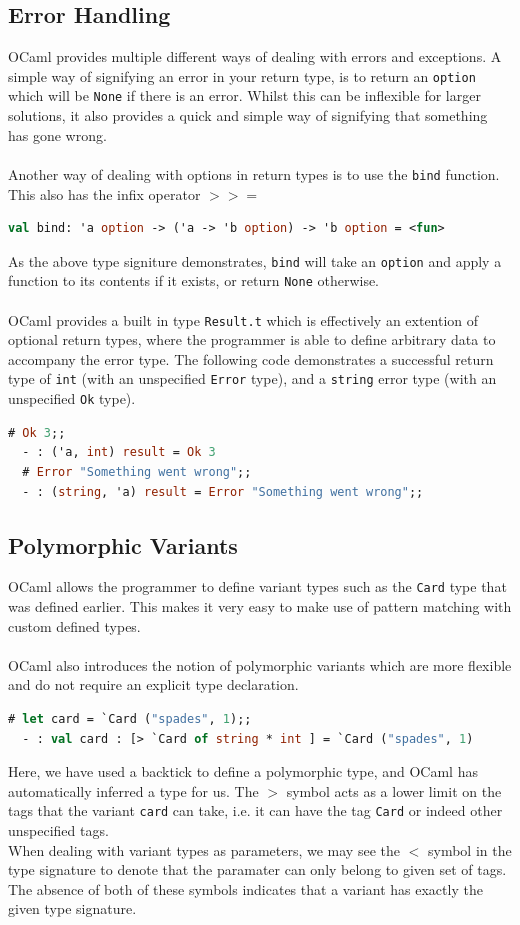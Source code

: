 \documentclass[12pt,a4paper,twoside,openright]{report}
\begin{document}
		\subsection*{Error Handling}
		OCaml provides multiple different ways of dealing with errors and exceptions. 
		A simple way of signifying an error in your return type, is to return an \texttt{option} which will be \texttt{None} if there is an error. 
		Whilst this can be inflexible for larger solutions, it also provides a quick and simple way of signifying that something has gone wrong.\\
		\\
		Another way of dealing with options in return types is to use the \texttt{bind} function. This also has the infix operator $>>=$
		\begin{lstlisting}[language=Caml,showstringspaces=false]
  val bind: 'a option -> ('a -> 'b option) -> 'b option = <fun>
		\end{lstlisting} 
		As the above type signiture demonstrates, \texttt{bind} will take an \texttt{option} and apply a function to its contents if it exists, or return \texttt{None} otherwise.\\
		\\
		OCaml provides a built in type \texttt{Result.t} which is effectively an extention of optional return types, where the programmer is able to define arbitrary data to accompany the error type. The following code demonstrates a successful return type of \texttt{int} (with an unspecified \texttt{Error} type), and a \texttt{string} error type (with an unspecified \texttt{Ok} type).
		\begin{lstlisting}[language=Caml,showstringspaces=false]
  # Ok 3;;
  - : ('a, int) result = Ok 3
  # Error "Something went wrong";;
  - : (string, 'a) result = Error "Something went wrong";;
		\end{lstlisting} 
		\subsection*{Polymorphic Variants}
		OCaml allows the programmer to define variant types such as the \texttt{Card} type that was defined earlier. This makes it very easy to make use of pattern matching with custom defined types.\\
		\\
		OCaml also introduces the notion of polymorphic variants which are more flexible and do not require an explicit type declaration.
		\begin{lstlisting}[language=Caml,showstringspaces=false]
  # let card = `Card ("spades", 1);;
  - : val card : [> `Card of string * int ] = `Card ("spades", 1)
		\end{lstlisting}
		Here, we have used a backtick to define a polymorphic type, and OCaml has automatically inferred a type for us. 
		The $>$ symbol acts as a lower limit on the tags that the variant \texttt{card} can take, i.e. it can have the tag \`\texttt{Card} or indeed other unspecified tags.\\
		When dealing with variant types as parameters, we may see the $<$ symbol in the type signature to denote that the paramater can only belong to given set of tags. The absence of both of these symbols indicates that a variant has exactly the given type signature. 
\end{document}
